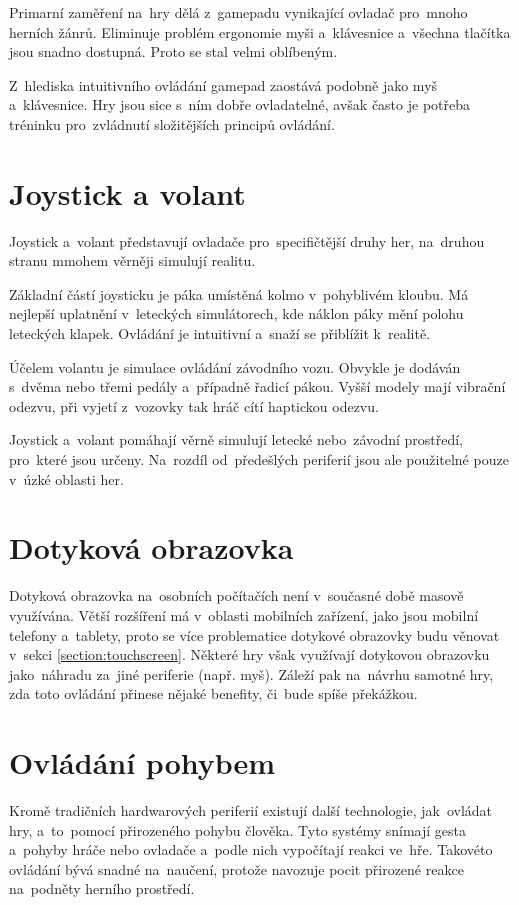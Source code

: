 \documentclass[thesis=B,czech,hidelinks]{FITthesis}[2012/06/26] %
\begin{document}
Primarní zaměření na~hry dělá z~gamepadu vynikající ovladač pro~mnoho herních žánrů. Eliminuje problém ergonomie myši a~klávesnice a~všechna tlačítka jsou snadno dostupná. Proto se stal velmi oblíbeným.

Z~hlediska intuitivního ovládání gamepad zaostává podobně jako myš a~klávesnice. Hry jsou sice s~ním dobře ovladatelné, avšak často je potřeba tréninku pro~zvládnutí složitějších principů ovládání.

\section{Joystick a volant}

Joystick a~volant představují ovladače pro~specifičtější druhy her, na~druhou stranu mmohem věrněji simulují realitu.

Základní částí joysticku je páka umístěná kolmo v~pohyblivém kloubu. Má nejlepší uplatnění v~leteckých simulátorech, kde náklon páky mění polohu leteckých klapek. Ovládání je intuitivní a~snaží se přiblížit k~realitě.

Účelem volantu je simulace ovládání závodního vozu. Obvykle je dodáván s~dvěma nebo třemi pedály a~případně řadicí pákou. Vyšší modely mají vibrační odezvu, při vyjetí z~vozovky tak hráč cítí haptickou odezvu.

Joystick a~volant pomáhají věrně simulují letecké nebo~závodní prostředí, pro~které jsou určeny. Na~rozdíl od~předešlých periferií jsou ale použitelné pouze v~úzké oblasti her.

\section{Dotyková obrazovka}

Dotyková obrazovka na~osobních počítačích není v~současné době masově využívána. Větší rozšíření má v~oblasti mobilních zařízení, jako jsou mobilní telefony a~tablety, proto se více problematice dotykové obrazovky budu věnovat v~sekci \ref{section:touchscreen}. Některé hry však využívají dotykovou obrazovku jako~náhradu za~jiné periferie (např. myš). Záleží pak na~návrhu samotné hry, zda toto ovládání přinese nějaké benefity, či~bude spíše překážkou.

\section{Ovládání pohybem}

Kromě tradičních hardwarových periferií existují další technologie, jak~ovládat hry, a~to~pomocí přirozeného pohybu člověka. Tyto systémy snímají gesta a~pohyby hráče nebo ovladače a~podle nich vypočítají reakci ve~hře. Takovéto ovládání bývá snadné na~naučení, protože navozuje pocit přirozené reakce na~podněty herního prostředí.
\end{document}
